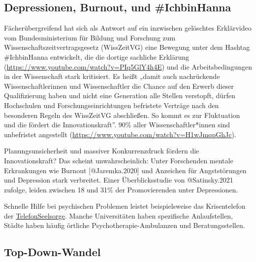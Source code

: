 \documentclass[
  letterpaper,
  DIV=11,
  numbers=noendperiod]{scrreprt}
\begin{document}
\subsection{Depressionen, Burnout, und
\#IchbinHanna}\label{depressionen-burnout-und-ichbinhanna}

Fächerübergreifend hat sich als Antwort auf ein inzwischen gelöschtes
Erklärvideo vom Bundesministerium für Bildung und Forschung zum
Wissenschaftszeitvertragsgesetz (WissZeitVG) eine Bewegung unter dem
Hashtag \#IchbinHanna entwickelt, die die dortige sachliche Erklärung
(\url{https://www.youtube.com/watch?v=PIq5GlY4h4E}) und die
Arbeitsbedingungen in der Wissenschaft stark kritisiert. Es heißt „damit
auch nachrückende Wissenschaftlerinnen und Wissenschaftler die Chance
auf den Erwerb dieser Qualifizierung haben und nicht eine Generation
alle Stellen verstopft, dürfen Hochschulen und Forschungseinrichtungen
befristete Verträge nach den besonderen Regeln des WissZeitVG
abschließen. So kommt es zur Fluktuation und die fördert die
Innovationskraft''. 90\% aller Wissenschaftler*innen sind unbefristet
angestellt (\url{https://www.youtube.com/watch?v=H1wJmqpGhJc}).

Planungsunsicherheit und massiver Konkurrenzdruck fördern die
Innovationskraft? Das scheint unwahrscheinlich: Unter Forschenden
mentale Erkrankungen wie Burnout {[}@Jaremka.2020{]} und Anzeichen für
Angststörungen und Depression stark verbreitet. Einer Überblicksstudie
von @Satinsky.2021 zufolge, leiden zwischen 18 und 31\% der
Promovierenden unter Depressionen.

\begin{tcolorbox}[enhanced jigsaw, bottomrule=.15mm, toprule=.15mm, opacitybacktitle=0.6, breakable, colback=white, coltitle=black, bottomtitle=1mm, toptitle=1mm, titlerule=0mm, title=\textcolor{quarto-callout-caution-color}{\faFire}\hspace{0.5em}{Wer hilft?}, rightrule=.15mm, arc=.35mm, opacityback=0, leftrule=.75mm, left=2mm, colbacktitle=quarto-callout-caution-color!10!white, colframe=quarto-callout-caution-color-frame]

Schnelle Hilfe bei psychischen Problemen leistet beispielsweise das
Krisentelefon der
\href{https://www.telefonseelsorge.de}{TelefonSeelsorge}. Manche
Universitäten haben spezifische Anlaufstellen, Städte haben häufig
örtliche Psychotherapie-Ambulanzen und Beratungsstellen.

\end{tcolorbox}

\subsection{Top-Down-Wandel}\label{top-down-wandel}
\end{document}
